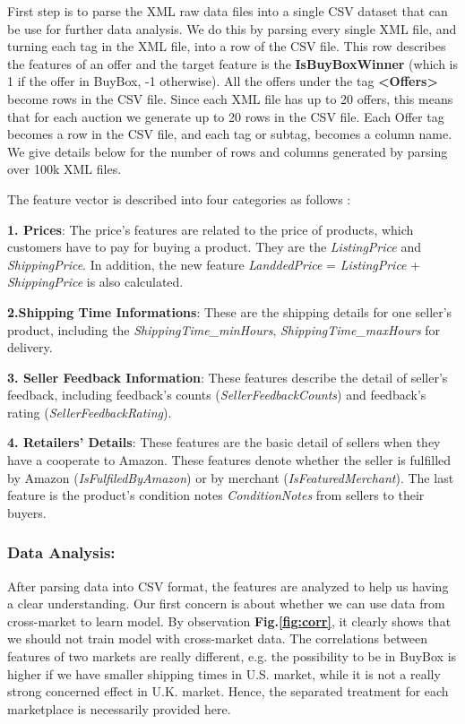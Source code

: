First step is to parse the XML raw data files into a single CSV dataset that can be use for further data analysis. We do this by parsing every single XML file, and turning each tag in the XML file, into a row of the CSV file. This row describes the features of an offer and the target feature is the \textbf{IsBuyBoxWinner} (which is 1 if the offer in BuyBox, -1 otherwise). All the offers under the tag \textbf{<Offers>} become rows in the CSV file. Since each XML file has up to 20 offers, this means that for each auction we generate up to 20 rows in the CSV file. Each Offer tag becomes a row in the CSV file, and each tag or subtag, becomes a column name. We give details below for the number of rows and columns generated by parsing over 100k XML files.

The feature vector is described into four categories as follows :

\textbf{1. Prices}: The price's features are related to the price of products, which customers have to pay for buying a product. They are the \textit{ListingPrice} and \textit{ShippingPrice}. In addition, the new feature \textit{LanddedPrice} = \textit{ListingPrice} + \textit{ShippingPrice} is also calculated.

\textbf{2.Shipping Time Informations}: These are the shipping details for one seller's product, including the \textit{ShippingTime\_minHours}, \textit{ShippingTime\_maxHours} for delivery. 

\textbf{3. Seller Feedback Information}: These features describe the detail of seller's feedback, including feedback's counts (\textit{SellerFeedbackCounts}) and feedback's rating (\textit{SellerFeedbackRating}). 

\textbf{4. Retailers' Details}: These features are the basic detail of  sellers when they have a cooperate to Amazon. These features denote whether the seller is fulfilled by Amazon (\textit{IsFulfiledByAmazon}) or by merchant (\textit{IsFeaturedMerchant}). The last feature is the product's condition notes \textit{ConditionNotes} from sellers to their buyers.

\subsubsection{Data Analysis:}
\label{sec:dataanalysis}

After parsing data into CSV format, the features are analyzed to help us having a clear understanding. Our first concern is about whether we can use data from cross-market to learn model. By observation \textbf{Fig.\ref{fig:corr}}, it clearly shows that we should not train model with cross-market data. The correlations between features of two markets are really different, e.g. the possibility to be in BuyBox is higher if we have smaller shipping times in U.S. market, while it is not a really strong concerned effect in U.K. market. %
Hence, the separated treatment for each marketplace is necessarily provided here.

